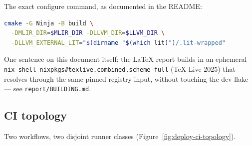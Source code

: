 The exact configure command, as documented in the README:

\begin{lstlisting}[language=bash]
cmake -G Ninja -B build \
  -DMLIR_DIR=$MLIR_DIR -DLLVM_DIR=$LLVM_DIR \
  -DLLVM_EXTERNAL_LIT="$(dirname "$(which lit)")/.lit-wrapped"
\end{lstlisting}

One sentence on this document itself: the \LaTeX{} report builds in an
ephemeral \texttt{nix shell nixpkgs\#texlive.combined.scheme-full} (TeX Live
2025) that resolves through the same pinned registry input, without touching
the dev flake --- see \texttt{report/BUILDING.md}.

\subsection{CI topology}\label{sec:deployment-ci}

Two workflows, two disjoint runner classes
(Figure~\ref{fig:deploy-ci-topology}).


